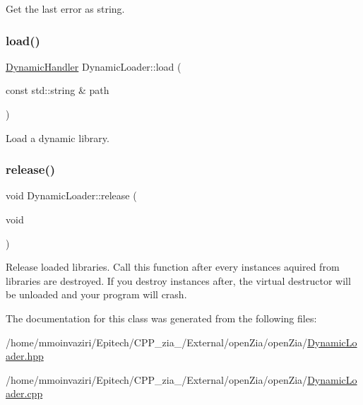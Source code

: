 Get the last error as string. 

\mbox{\label{classo_z_1_1_dynamic_loader_a1a0201ebc77bdd744aa528d7cb999a89}} 
\subsubsection{\texorpdfstring{load()}{load()}}
{\footnotesize\ttfamily \mbox{\hyperlink{namespaceo_z_a4f8ae5685d0f7dca498d73129b482f2d}{Dynamic\+Handler}} Dynamic\+Loader\+::load (\begin{DoxyParamCaption}\item[{const std\+::string \&}]{path }\end{DoxyParamCaption})}



Load a dynamic library. 

\mbox{\label{classo_z_1_1_dynamic_loader_a405559cdad1b8eba0bd3bee22fa764f9}} 
\subsubsection{\texorpdfstring{release()}{release()}}
{\footnotesize\ttfamily void Dynamic\+Loader\+::release (\begin{DoxyParamCaption}\item[{void}]{ }\end{DoxyParamCaption})}



Release loaded libraries. Call this function after every instances aquired from libraries are destroyed. If you destroy instances after, the virtual destructor will be unloaded and your program will crash. 



The documentation for this class was generated from the following files\+:\begin{DoxyCompactItemize}
\item 
/home/mmoinvaziri/\+Epitech/\+C\+P\+P\+\_\+zia\+\_/\+External/open\+Zia/open\+Zia/\mbox{\hyperlink{_dynamic_loader_8hpp}{Dynamic\+Loader.\+hpp}}\item 
/home/mmoinvaziri/\+Epitech/\+C\+P\+P\+\_\+zia\+\_/\+External/open\+Zia/open\+Zia/\mbox{\hyperlink{_dynamic_loader_8cpp}{Dynamic\+Loader.\+cpp}}\end{DoxyCompactItemize}
